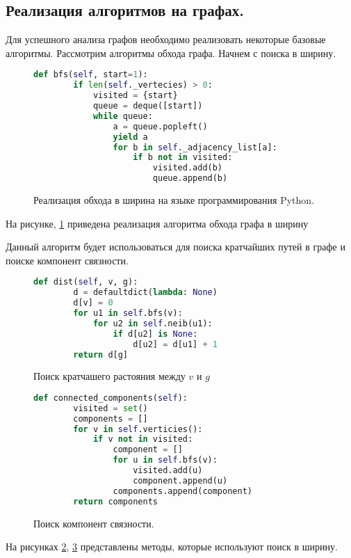 \subsection{Реализация алгоритмов на графах.}
Для успешного анализа графов необходимо реализовать
некоторые базовые алгоритмы. 
Рассмотрим алгоритмы обхода графа. Начнем с поиска в ширину.
\begin{figure}[H] 
\begin{lstlisting}[language=Python] 
    def bfs(self, start=1):
        if len(self._vertecies) > 0:
            visited = {start}
            queue = deque([start])
            while queue:
                a = queue.popleft()
                yield a
                for b in self._adjacency_list[a]:
                    if b not in visited:
                        visited.add(b)
                        queue.append(b)
\end{lstlisting}  
    \caption{Реализация обхода в ширина на языке программирования Python.}
    \label{sec:bfspy}
\end{figure} 
На рисунке, \ref{sec:bfspy}
приведена  реализация алгоритма обхода графа в ширину

Данный алгоритм будет использоваться для поиска кратчайших путей в графе
и поиске компонент связности.
\begin{figure}[H] 
\begin{lstlisting}[language=Python] 
    def dist(self, v, g):
        d = defaultdict(lambda: None)
        d[v] = 0
        for u1 in self.bfs(v):
            for u2 in self.neib(u1):
                if d[u2] is None:
                    d[u2] = d[u1] + 1
        return d[g]
\end{lstlisting}  
    \caption{Поиск кратчашего растояния между $v$ и  $g$}
    \label{mindist}
\end{figure} 
\begin{figure}[H] 
\begin{lstlisting}[language=Python] 
    def connected_components(self):
        visited = set()
        components = []
        for v in self.verticies():
            if v not in visited:
                component = []
                for u in self.bfs(v):
                    visited.add(u)
                    component.append(u)
                components.append(component)
        return components
\end{lstlisting}  
    \caption{Поиск компонент связности.}
    \label{concomp}
\end{figure} 
На рисунках \ref{mindist}, \ref{concomp}
представлены методы, которые используют поиск в ширину.

